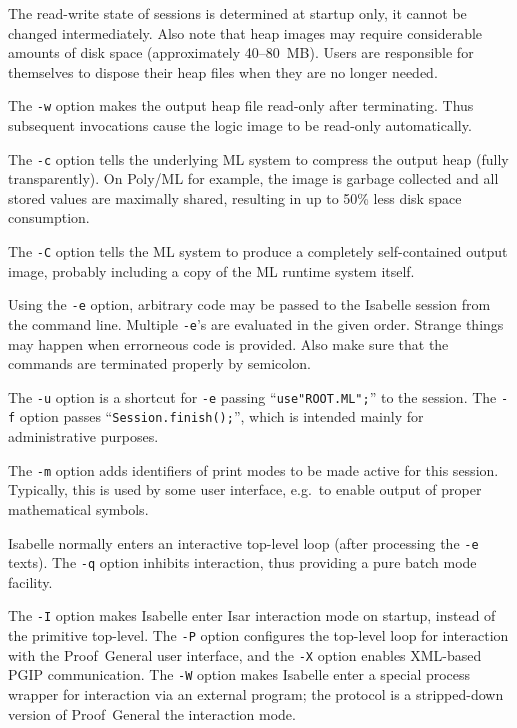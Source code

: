 The read-write state of sessions is determined at startup only, it cannot be
changed intermediately. Also note that heap images may require considerable
amounts of disk space (approximately 40--80~MB). Users are responsible for
themselves to dispose their heap files when they are no longer needed.

\medskip The \texttt{-w} option makes the output heap file read-only after
terminating.  Thus subsequent invocations cause the logic image to be
read-only automatically.

\medskip The \texttt{-c} option tells the underlying ML system to compress the
output heap (fully transparently).  On Poly/ML for example, the image is
garbage collected and all stored values are maximally shared, resulting in up
to 50\% less disk space consumption.

\medskip The \texttt{-C} option tells the ML system to produce a completely
self-contained output image, probably including a copy of the ML runtime
system itself.

\medskip Using the \texttt{-e} option, arbitrary {\ML} code may be passed to
the Isabelle session from the command line. Multiple \texttt{-e}'s are
evaluated in the given order. Strange things may happen when errorneous {\ML}
code is provided. Also make sure that the {\ML} commands are terminated
properly by semicolon.

\medskip The \texttt{-u} option is a shortcut for \texttt{-e} passing
``\texttt{use"ROOT.ML";}'' to the {\ML} session.  The \texttt{-f} option
passes ``\texttt{Session.finish();}'', which is intended mainly for
administrative purposes.

\medskip The \texttt{-m} option adds identifiers of print modes to be made
active for this session. Typically, this is used by some user interface, e.g.\ 
to enable output of proper mathematical symbols.

\medskip Isabelle normally enters an interactive top-level loop (after
processing the \texttt{-e} texts). The \texttt{-q} option inhibits
interaction, thus providing a pure batch mode facility.

\medskip The \texttt{-I} option makes Isabelle enter Isar interaction
mode on startup, instead of the primitive {\ML} top-level.  The
\texttt{-P} option configures the top-level loop for interaction with
the Proof~General user interface, and the \texttt{-X} option enables
XML-based PGIP communication.  The \texttt{-W} option makes Isabelle
enter a special process wrapper for interaction via an external
program; the protocol is a stripped-down version of Proof~General the
interaction mode.

